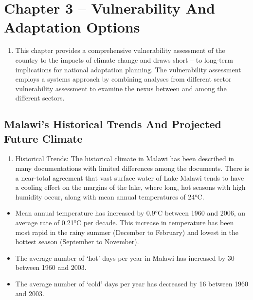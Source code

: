 \documentclass[
]{book}
\providecommand{\tightlist}{%
  \setlength{\itemsep}{0pt}\setlength{\parskip}{0pt}}
\begin{document}
\hypertarget{chapter-3-vulnerability-and-adaptation-options}{%
\chapter{Chapter 3 -- Vulnerability And Adaptation Options}\label{chapter-3-vulnerability-and-adaptation-options}}

\begin{enumerate}
\def\labelenumi{\arabic{enumi}.}
\setcounter{enumi}{48}
\tightlist
\item
  This chapter provides a comprehensive vulnerability assessment of the country to the impacts of climate change and draws short -- to long-term implications for national adaptation planning. The vulnerability assessment employs a systems approach by combining analyses from different sector vulnerability assessment to examine the nexus between and among the different sectors.
\end{enumerate}

\hypertarget{malawis-historical-trends-and-projected-future-climate}{%
\section{Malawi's Historical Trends And Projected Future Climate}\label{malawis-historical-trends-and-projected-future-climate}}

\begin{enumerate}
\def\labelenumi{\arabic{enumi}.}
\setcounter{enumi}{49}
\tightlist
\item
  Historical Trends: The historical climate in Malawi has been described in many documentations with limited differences among the documents. There is a near-total agreement that vast surface water of Lake Malawi tends to have a cooling effect on the margins of the lake, where long, hot seasons with high humidity occur, along with mean annual temperatures of 24°C.
\end{enumerate}

\begin{itemize}
\tightlist
\item
  Mean annual temperature has increased by 0.9°C between 1960 and 2006, an average rate of 0.21°C per decade. This increase in temperature has been most rapid in the rainy summer (December to February) and lowest in the hottest season (September to November).
\item
  The average number of `hot' days per year in Malawi has increased by 30 between 1960 and 2003.
\item
  The average number of `cold' days per year has decreased by 16 between 1960 and 2003.
\end{itemize}
\end{document}
